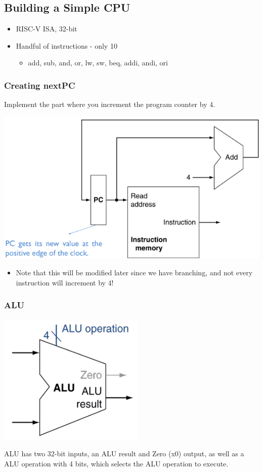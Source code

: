 \documentclass[10pt]{article}
\begin{document}
\subsection*{Building a Simple CPU}
\begin{itemize}
    \item RISC-V ISA, 32-bit
    \item Handful of instructions - only 10
    \begin{itemize}        
        \item add, sub, and, or, lw, sw, beq, addi, andi, ori
    \end{itemize}
\end{itemize}
\subsubsection*{Creating nextPC}
Implement the part where you increment the program counter by 4.
\begin{center}
    \includegraphics*[scale=0.4]{W2_7.png}
\end{center}
\begin{itemize}
    \item Note that this will be modified later since we have branching, and not every instruction will increment by 4!
\end{itemize}
\subsubsection*{ALU}
\begin{center}
    \includegraphics[scale=0.8]{W2_8.png}
\end{center}
ALU has two 32-bit inputs, an ALU result and Zero (x0) output, as well as a ALU operation with 4 bits, which selects the ALU operation to execute.
\end{document}
